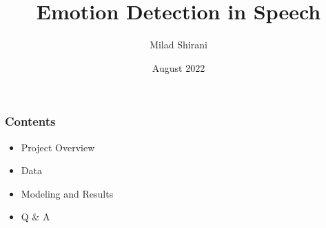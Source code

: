 \documentclass[xcolor={table}]{beamer}
\title{Emotion Detection in Speech}
\author{Milad Shirani}
\date{August 2022}
\begin{document}
	\setcounter{showProgressBar}{0}
	\setcounter{showSlideNumbers}{0}
	

	\frame{\titlepage}

	\begin{frame}
		\frametitle{Contents}
		\begin{itemize}
			\item Project Overview 
			\item Data 
			\item Modeling and Results
			\item Q \& A
		\end{itemize}
	\end{frame}

	\setcounter{framenumber}{0}
	\setcounter{showProgressBar}{1}
	\setcounter{showSlideNumbers}{1}
	
\end{document}
